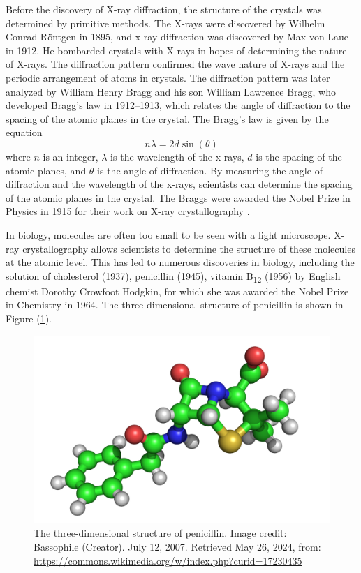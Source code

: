 \documentclass[10pt]{article}
\begin{document}
Before the discovery of X-ray diffraction, the structure of the crystals was determined by primitive methods. The X-rays were discovered by Wilhelm Conrad Röntgen in 1895, and x-ray diffraction was discovered by Max von Laue in 1912. He bombarded crystals with X-rays in hopes of determining the nature of X-rays. The diffraction pattern confirmed the wave nature of X-rays and the periodic arrangement of atoms in crystals. The diffraction pattern was later analyzed by William Henry Bragg and his son William Lawrence Bragg, who developed Bragg's law in 1912--1913, which relates the angle of diffraction to the spacing of the atomic planes in the crystal. The Bragg's law is given by the equation
\begin{equation}
  n \lambda = 2 d \sin(\theta)
\end{equation}
where $n$ is an integer, $\lambda$ is the wavelength of the x-rays, $d$ is the spacing of the atomic planes, and $\theta$ is the angle of diffraction. By measuring the angle of diffraction and the wavelength of the x-rays, scientists can determine the spacing of the atomic planes in the crystal. The Braggs were awarded the Nobel Prize in Physics in 1915 for their work on X-ray crystallography \cite{Bragg_1913}.

In biology, molecules are often too small to be seen with a light microscope. X-ray crystallography allows scientists to determine the structure of these molecules at the atomic level. This has led to numerous discoveries in biology, including the solution of cholesterol (1937), penicillin (1945), vitamin B\textsubscript{12} (1956) by English chemist Dorothy Crowfoot Hodgkin, for which she was awarded the Nobel Prize in Chemistry in 1964. The three-dimensional structure of penicillin is shown in Figure (\ref{fig:2}).

\begin{figure}[ht]
  \centering
  \includegraphics[scale=0.2]{figures/f2.png}
  \caption{The three-dimensional structure of penicillin. Image credit: Bassophile (Creator). July 12, 2007. Retrieved May 26, 2024, from: \url{https://commons.wikimedia.org/w/index.php?curid=17230435}}
  \label{fig:2}
\end{figure}
\end{document}
